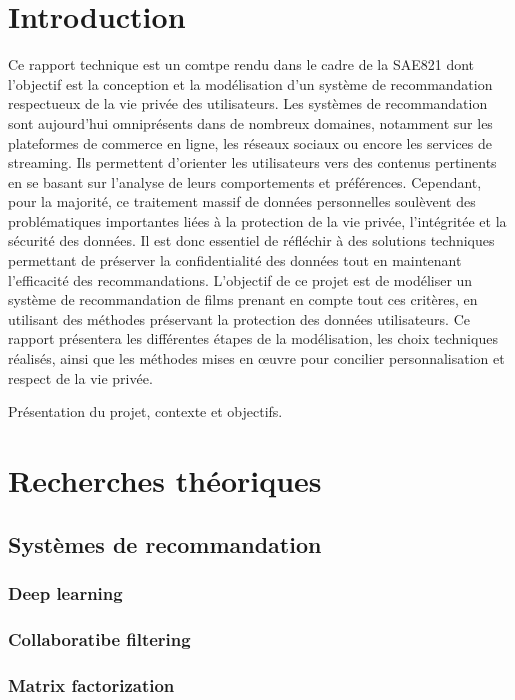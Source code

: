 \documentclass{article}
\begin{document}
\tableofcontents
\newpage

\section*{Introduction}
Ce rapport technique est un comtpe rendu dans le cadre de la SAE821 dont l'objectif est la conception et la modélisation d’un système de recommandation respectueux de la vie privée des utilisateurs. Les systèmes de recommandation sont aujourd’hui omniprésents dans de nombreux domaines, notamment sur les plateformes de commerce en ligne, les réseaux sociaux ou encore les services de streaming. Ils permettent d’orienter les utilisateurs vers des contenus pertinents en se basant sur l’analyse de leurs comportements et préférences.
Cependant, pour la majorité, ce traitement massif de données personnelles soulèvent des problématiques importantes liées à la protection de la vie privée, l'intégritée et la sécurité des données. Il est donc essentiel de réfléchir à des solutions techniques permettant de préserver la confidentialité des données tout en maintenant l’efficacité des recommandations.
L’objectif de ce projet est de modéliser un système de recommandation de films prenant en compte tout ces critères, en utilisant des méthodes préservant la protection des données utilisateurs. Ce rapport présentera les différentes étapes de la modélisation, les choix techniques réalisés, ainsi que les méthodes mises en œuvre pour concilier personnalisation et respect de la vie privée.
Présentation du projet, contexte et objectifs.

\section{Recherches théoriques}
\subsection{Systèmes de recommandation}
\subsubsection{Deep learning}
\subsubsection{Collaboratibe filtering}
\subsubsection{Matrix factorization}
\end{document}
